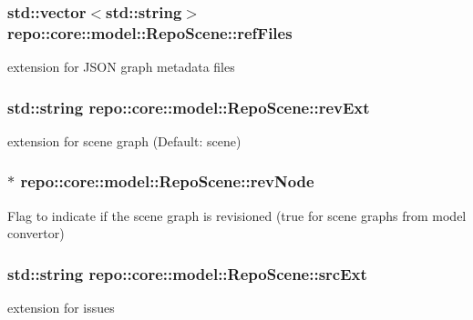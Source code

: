 \subsubsection[{ref\+Files}]{\setlength{\rightskip}{0pt plus 5cm}std\+::vector$<$std\+::string$>$ repo\+::core\+::model\+::\+Repo\+Scene\+::ref\+Files\hspace{0.3cm}{\ttfamily [protected]}}\label{classrepo_1_1core_1_1model_1_1_repo_scene_a72ff48bdd737480c5dd98edb4a39a557}
extension for J\+S\+O\+N graph metadata files \hypertarget{classrepo_1_1core_1_1model_1_1_repo_scene_ab33974cb8caec149fdd9743339f4d2ab}{}
\subsubsection[{rev\+Ext}]{\setlength{\rightskip}{0pt plus 5cm}std\+::string repo\+::core\+::model\+::\+Repo\+Scene\+::rev\+Ext\hspace{0.3cm}{\ttfamily [protected]}}\label{classrepo_1_1core_1_1model_1_1_repo_scene_ab33974cb8caec149fdd9743339f4d2ab}
extension for scene graph (Default\+: scene) \hypertarget{classrepo_1_1core_1_1model_1_1_repo_scene_a8c14ab145d410fb70f0cecec10f8d162}{}
\subsubsection[{rev\+Node}]{$\ast$ repo\+::core\+::model\+::\+Repo\+Scene\+::rev\+Node\hspace{0.3cm}{\ttfamily [protected]}}\label{classrepo_1_1core_1_1model_1_1_repo_scene_a8c14ab145d410fb70f0cecec10f8d162}
Flag to indicate if the scene graph is revisioned (true for scene graphs from model convertor) \hypertarget{classrepo_1_1core_1_1model_1_1_repo_scene_aaa568af1ee2cde77df38f4c3badb5981}{}
\subsubsection[{src\+Ext}]{\setlength{\rightskip}{0pt plus 5cm}std\+::string repo\+::core\+::model\+::\+Repo\+Scene\+::src\+Ext\hspace{0.3cm}{\ttfamily [protected]}}\label{classrepo_1_1core_1_1model_1_1_repo_scene_aaa568af1ee2cde77df38f4c3badb5981}
extension for issues \hypertarget{classrepo_1_1core_1_1model_1_1_repo_scene_a9e1ec4f9fa275647a75838361b3d2a5d}{}
